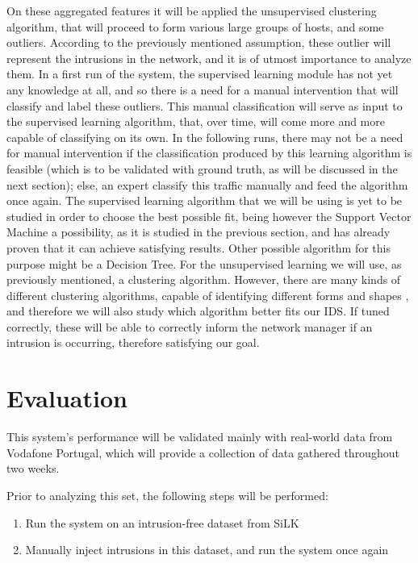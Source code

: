 \documentclass[runningheads,a4paper]{llncs}
\begin{document}
On these aggregated features it will be applied the unsupervised clustering algorithm, that will proceed to form various large groups of hosts, and some outliers. According to the previously mentioned assumption, these outlier will represent the intrusions in the network, and it is of utmost importance to analyze them. In a first run of the system, the supervised learning module has not yet any knowledge at all, and so there is a need for a manual intervention that will classify and label these outliers. This manual classification will serve as input to the supervised learning algorithm, that, over time, will come more and more capable of classifying on its own. In the following runs, there may not be a need for manual intervention if the classification produced by this learning algorithm is feasible (which is to be validated with ground truth, as will be discussed in the next section); else, an expert classify this traffic manually and feed the algorithm once again. The supervised learning algorithm that we will be using is yet to be studied in order to choose the best possible fit, being however the Support Vector Machine a possibility, as it is studied in the previous section, and has already proven that it can achieve satisfying results. Other possible algorithm for this purpose might be a Decision Tree. For the unsupervised learning we will use, as previously mentioned, a clustering algorithm. However, there are many kinds of different clustering algorithms, capable of identifying different forms and shapes \cite{Casas2012}, and therefore we will also study which algorithm better fits our IDS. If tuned correctly, these will be able to correctly inform the network manager if an intrusion is occurring, therefore satisfying our goal.

\section{Evaluation}\label{sec:eval}

This system's performance will be validated mainly with real-world data from Vodafone Portugal, which will provide a collection of data gathered throughout two weeks. 

Prior to analyzing this set, the following steps will be performed:
\begin{enumerate}
\item Run the system on an intrusion-free dataset from SiLK \cite{silk}
\item Manually inject intrusions in this dataset, and run the system once again 
\end{enumerate}
\end{document}
